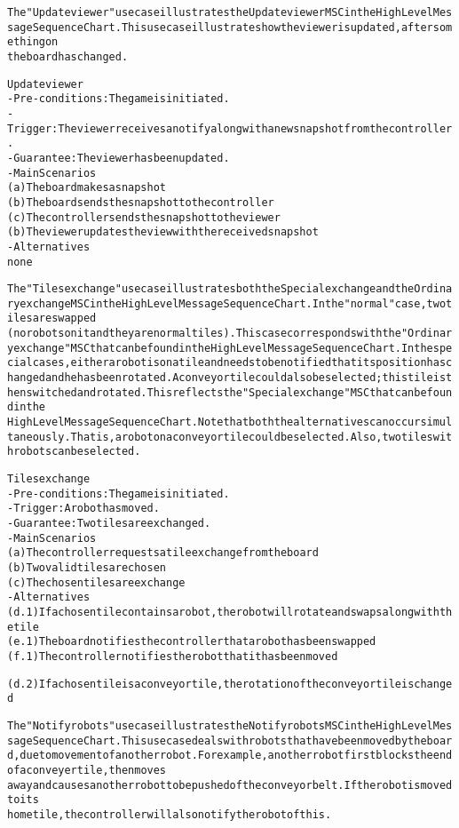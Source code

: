 \begin{alltt}
The "Update viewer" use case illustrates the Update viewer MSC in the High Level Message Sequence Chart. This use case illustrates how the viewer is updated, after something on 
the board has changed.

Update viewer
- Pre-conditions: The game is initiated.
- Trigger: The viewer receives a notify along with a new snapshot from the controller.
- Guarantee: The viewer has been updated.
- Main Scenarios
    (a) The board makes a snapshot
    (b) The board sends the snapshot to the controller
    (c) The controller sends the snapshot to the viewer
    (b) The viewer updates the view with the received snapshot
- Alternatives
    none

The "Tiles exchange" use case illustrates both the Special exchange and the Ordinary exchange MSC in the High Level Message Sequence Chart. In the "normal" case, two tiles are swapped
(no robots on it and they are normal tiles). This case corresponds with the "Ordinary exchange" MSC that can be found in the High Level Message Sequence Chart. In the special cases, either a robot is on a tile and needs to be notified that its position has changed and he has been rotated. A conveyor tile could also be selected; this tile is then switched and rotated. This reflects the "Special exchange" MSC that can be found in the
High Level Message Sequence Chart. Note that both the alternatives can occur simultaneously. That is, a robot on a conveyor tile could be selected. Also, two tiles with robots can be selected.

Tiles exchange
- Pre-conditions: The game is initiated.
- Trigger:  A robot has moved.
- Guarantee: Two tiles are exchanged.
- Main Scenarios
    (a) The controller requests a tile exchange from the board
    (b) Two valid tiles are chosen
    (c) The chosen tiles are exchange
- Alternatives
    (d.1) If a chosen tile contains a robot, the robot will rotate and swaps along with the tile
    (e.1) The board notifies the controller that a robot has been swapped
    (f.1) The controller notifies the robot that it has been moved

    (d.2) If a chosen tile is a conveyor tile, the rotation of the conveyor tile is changed

The "Notify robots" use case illustrates the Notify robots MSC in the High Level Message Sequence Chart. This use case deals with robots that have been moved by the board, due to movement of another robot. For example, another robot first blocks the end of a conveyer tile, then moves 
away and causes another robot to be pushed of the conveyor belt. If the robot is moved to its 
home tile, the controller will also notify the robot of this.


\end{alltt}
